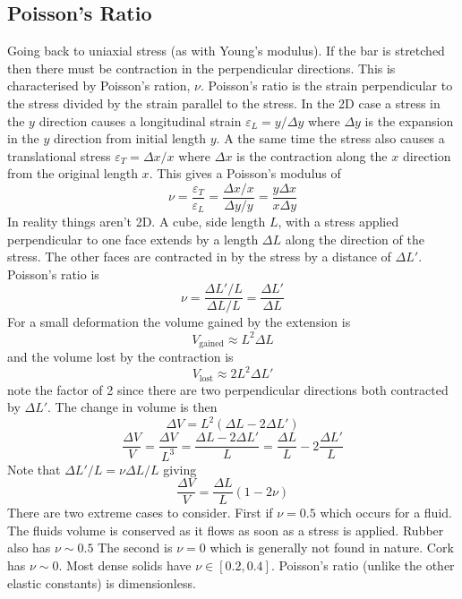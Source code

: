     \subsection{Poisson's Ratio}
    Going back to uniaxial stress (as with Young's modulus).
    If the bar is stretched then there must be contraction in the perpendicular directions.
    This is characterised by Poisson's ration, \(\nu\).
    Poisson's ratio is the strain perpendicular to the stress divided by the strain parallel to the stress.
    In the 2D case a stress in the \(y\) direction causes a longitudinal strain \(\varepsilon_L = y/\Delta y\) where \(\Delta y\) is the expansion in the \(y\) direction from initial length \(y\).
    A the same time the stress also causes a translational stress \(\varepsilon_T = \Delta x/x\) where \(\Delta x\) is the contraction along the \(x\) direction from the original length \(x\).
    This gives a Poisson's modulus of
    \[\nu = \frac{\varepsilon_T}{\varepsilon_L} = \frac{\Delta x/x}{\Delta y/y} = \frac{y\Delta x}{x\Delta y}\]
    In reality things aren't 2D.
    A cube, side length \(L\), with a stress applied perpendicular to one face extends by a length \(\Delta L\) along the direction of the stress.
    The other faces are contracted in by the stress by a distance of \(\Delta L'\).
    Poisson's ratio is
    \[\nu = \frac{\Delta L'/L}{\Delta L/L} = \frac{\Delta L'}{\Delta L}\]
    For a small deformation the volume gained by the extension is
    \[V_\text{gained} \approx L^2\Delta L\]
    and the volume lost by the contraction is
    \[V_\text{lost} \approx 2L^2\Delta L'\]
    note the factor of 2 since there are two perpendicular directions both contracted by \(\Delta L'\).
    The change in volume is then
    \[\Delta V = L^2(\Delta L - 2\Delta L')\]
    \[\frac{\Delta V}{V} = \frac{\Delta V}{L^3} = \frac{\Delta L - 2\Delta L'}{L} = \frac{\Delta L}{L} - 2\frac{\Delta L'}{L}\]
    Note that \(\Delta L'/L = \nu\Delta L/L\) giving
    \[\frac{\Delta V}{V} = \frac{\Delta L}{L}(1 - 2\nu)\]
    There are two extreme cases to consider.
    First if \(\nu = 0.5\) which occurs for a fluid.
    The fluids volume is conserved as it flows as soon as a stress is applied.
    Rubber also has \(\nu\sim0.5\)
    The second is \(\nu = 0\) which is generally not found in nature.
    Cork has \(\nu\sim0\).
    Most dense solids have \(\nu\in[0.2, 0.4]\).
    Poisson's ratio (unlike the other elastic constants) is dimensionless.
    
